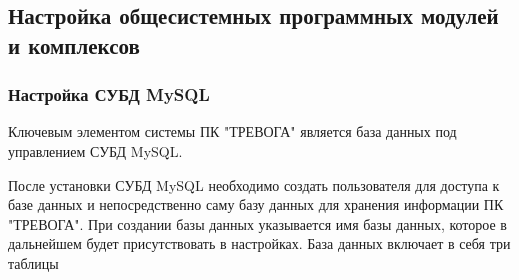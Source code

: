 \documentclass[12pt]{article}[a4paper,14pt,russian]
\begin{document}
	\subsection {Настройка общесистемных программных модулей и комплексов}
	
	\subsubsection {Настройка СУБД MySQL}
	Ключевым элементом системы ПК "ТРЕВОГА" является база данных под управлением СУБД MySQL. 
	
	После установки СУБД MySQL необходимо создать пользователя для доступа к базе данных и непосредственно саму базу данных для хранения информации ПК "ТРЕВОГА". При создании базы данных указывается имя базы данных, которое в дальнейшем будет присутствовать в настройках. База данных включает в себя три таблицы
\end{document}
